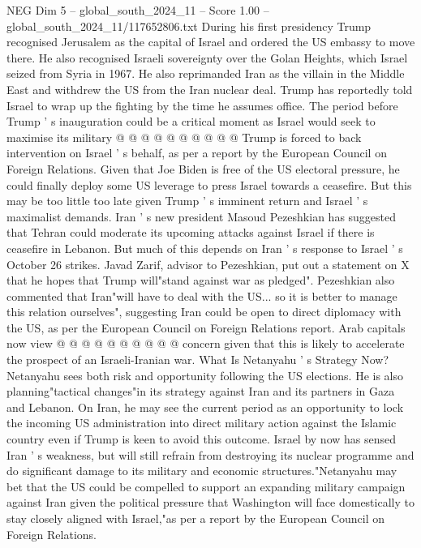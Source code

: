 \begin{textsample}{NEG Dim 5 – global\_south\_2024\_11 – Score 1.00 – global\_south\_2024\_11/117652806.txt}
During his first presidency Trump recognised Jerusalem as the capital of Israel and ordered the US embassy to move there.
He also recognised Israeli sovereignty over the Golan Heights, which Israel seized from Syria in 1967.
He also reprimanded Iran as the villain in the Middle East and withdrew the US from the Iran nuclear deal.
Trump has reportedly told Israel to wrap up the fighting by the time he assumes office.
The period before Trump ' s inauguration could be a critical moment as Israel would seek to maximise its military @ @ @ @ @ @ @ @ @ @ Trump is forced to back intervention on Israel ' s behalf, as per a report by the European Council on Foreign Relations.
Given that Joe Biden is free of the US electoral pressure, he could finally deploy some US leverage to press Israel towards a ceasefire.
But this may be too little too late given Trump ' s imminent return and Israel ' s maximalist demands.
Iran ' s new president Masoud Pezeshkian has suggested that Tehran could moderate its upcoming attacks against Israel if there is ceasefire in Lebanon.
But much of this depends on Iran ' s response to Israel ' s October 26 strikes.
Javad Zarif, advisor to Pezeshkian, put out a statement on X that he hopes that Trump will"stand against war as pledged".
Pezeshkian also commented that Iran"will have to deal with the US... so it is better to manage this relation ourselves", suggesting Iran could be open to direct diplomacy with the US, as per the European Council on Foreign Relations report.
Arab capitals now view @ @ @ @ @ @ @ @ @ @ concern given that this is likely to accelerate the prospect of an Israeli-Iranian war.
What Is Netanyahu ' s Strategy Now?
Netanyahu sees both risk and opportunity following the US elections.
He is also planning"tactical changes"in its strategy against Iran and its partners in Gaza and Lebanon.
On Iran, he may see the current period as an opportunity to lock the incoming US administration into direct military action against the Islamic country even if Trump is keen to avoid this outcome.
Israel by now has sensed Iran ' s weakness, but will still refrain from destroying its nuclear programme and do significant damage to its military and economic structures."Netanyahu may bet that the US could be compelled to support an expanding military campaign against Iran given the political pressure that Washington will face domestically to stay closely aligned with Israel,"as per a report by the European Council on Foreign Relations.

\end{textsample}
